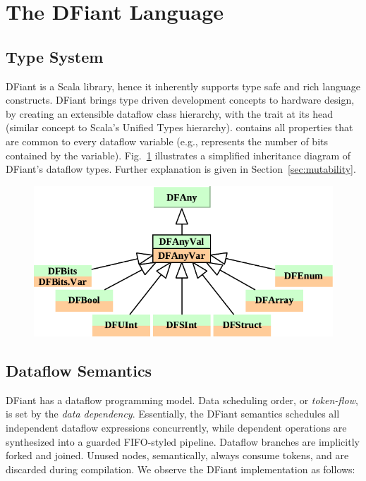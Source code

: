 \section{The DFiant Language}
\label{sec:dfiant}
\subsection{Type System}
DFiant is a Scala library, hence it inherently supports type safe and rich language constructs. DFiant brings type driven development concepts to hardware design, by creating an extensible dataflow class hierarchy, with the trait  at its head (similar concept to Scala's Unified Types hierarchy).  contains all properties that are common to every dataflow variable (e.g.,  represents the number of bits contained by the variable). Fig.~\ref{fig:Inherit} illustrates a simplified inheritance diagram of DFiant's dataflow types. Further explanation is given in Section~\ref{sec:mutability}. 

\begin{figure}[h]
	\centering
	\includegraphics[scale=0.7]{graphics/Inherit.pdf} 
	\label{fig:Inherit}
\end{figure}

\subsection{Dataflow Semantics}
DFiant has a dataflow programming model. Data scheduling order, or \textit{token-flow}, is set by the \textit{data dependency}. Essentially, the DFiant semantics schedules all independent dataflow expressions concurrently, while dependent operations are synthesized into a guarded FIFO-styled pipeline. Dataflow branches are implicitly forked and joined. Unused nodes, semantically, always consume tokens, and are discarded during compilation. We observe the DFiant  implementation as follows:

